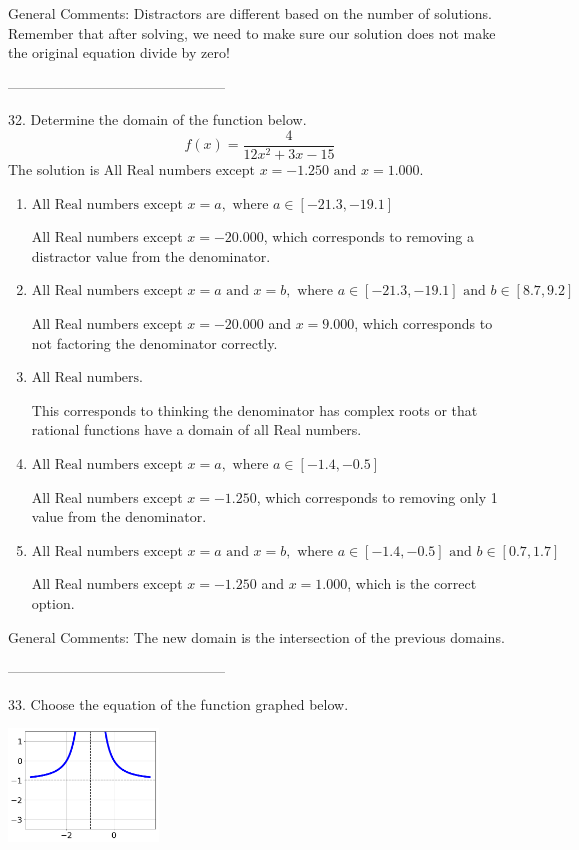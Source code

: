 \documentclass{article}[14pt]
\begin{document}
General Comments: Distractors are different based on the number of solutions. Remember that after solving, we need to make sure our solution does not make the original equation divide by zero!

-----------------------------------------------

32. Determine the domain of the function below.
$$ f(x) = \frac{4}{12x^{2} +3 x -15} $$ 
The solution is $ \text{All Real numbers except } x = -1.250 \text{ and } x = 1.000. $ 

\begin{enumerate}[label=\Alph*.] 
\item $ \text{All Real numbers except } x = a, \text{ where } a \in [-21.3, -19.1] $ 

 All Real numbers except $x = -20.000$, which corresponds to removing a distractor value from the denominator. 
\item $ \text{All Real numbers except } x = a \text{ and } x = b, \text{ where } a \in [-21.3, -19.1] \text{ and } b \in [8.7, 9.2] $ 

 All Real numbers except $x = -20.000$ and $x = 9.000$, which corresponds to not factoring the denominator correctly. 
\item $ \text{All Real numbers.} $ 

 This corresponds to thinking the denominator has complex roots or that rational functions have a domain of all Real numbers. 
\item $ \text{All Real numbers except } x = a, \text{ where } a \in [-1.4, -0.5] $ 

 All Real numbers except $x = -1.250$, which corresponds to removing only 1 value from the denominator. 
\item $ \text{All Real numbers except } x = a \text{ and } x = b, \text{ where } a \in [-1.4, -0.5] \text{ and } b \in [0.7, 1.7] $ 

 All Real numbers except $x = -1.250$ and $x = 1.000$, which is the correct option. 
\end{enumerate} 
 
General Comments: The new domain is the intersection of the previous domains.

-----------------------------------------------

33. Choose the equation of the function graphed below.
\begin{center} \includegraphics[width=0.3\textwidth]{../Figures/rationalGraphToEquationC.png} \end{center} 
\end{document}
